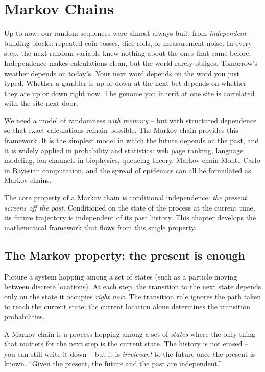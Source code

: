 \chapter{Markov Chains}

Up to now, our random sequences were almost always built from \emph{independent}
building blocks: repeated coin tosses, dice rolls, or measurement noise.
In every step, the next random variable knew nothing about the ones that came before.
Independence makes calculations clean, but the world rarely obliges. Tomorrow's weather
depends on today's. Your next word depends on the word you just typed. Whether a gambler is
up or down at the next bet depends on whether they are up or down right now. The genome you
inherit at one site is correlated with the site next door.

We need a model of randomness \emph{with memory} -- but with structured dependence so
that exact calculations remain possible. The Markov chain provides this framework.
It is the simplest model in which the future depends on the past, and it is widely applied
in probability and statistics: web page ranking, language modeling, ion channels in biophysics,
queueing theory, Markov chain Monte Carlo in Bayesian computation, and the spread of
epidemics can all be formulated as Markov chains.

The core property of a Markov chain is conditional independence: \emph{the present screens
off the past}. Conditioned on the state of the process at the current time, its future trajectory
is independent of its past history. This chapter develops the mathematical framework that
flows from this single property.

\chapterline

\section{The Markov property: the present is enough}
\label{ch23:markov-property}

Picture a system hopping among a set of states (such as a particle moving between discrete locations).
At each step, the transition to the next state depends only on the state it occupies
\emph{right now}. The transition rule ignores the path taken to reach the current state;
the current location alone determines the transition probabilities.

\begin{intuitionbox}
A Markov chain is a process hopping among a set of \emph{states} where the only thing that matters
for the next step is the current state. The history is not erased -- you can still write it
down -- but it is \emph{irrelevant} to the future once the present is known. ``Given the
present, the future and the past are independent.''
\end{intuitionbox}

